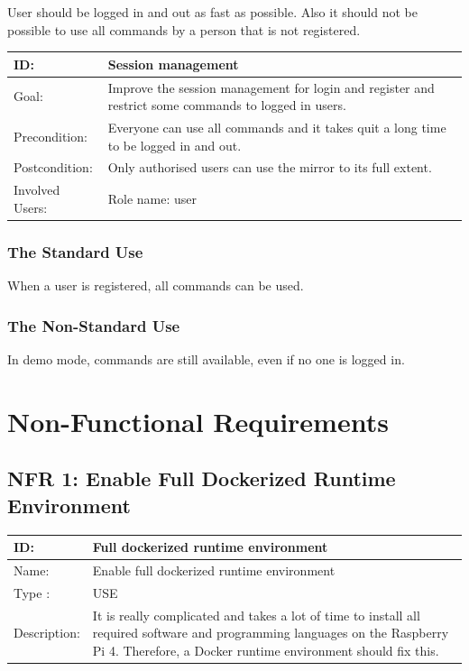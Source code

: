 \documentclass[12pt]{article}
\theoremstyle{definition}
\begin{document}
User should be logged in and out as fast as possible. Also it should not be possible to use all commands  by a person that is not registered. 

\begin{tabular}{|p{.2\linewidth}|p{.65\linewidth}|}
\hline 
ID: & Session management\\ \hline
Goal: & Improve the session management for login and register and restrict some commands to logged in users.\\ \hline
Precondition: & Everyone can use all commands and it takes quit a long time to be logged in and out.\\ \hline
Postcondition: & Only authorised users can use the mirror to its full extent.\\ \hline
Involved Users: & Role name: user \\ \hline
\end{tabular}

\subsubsection{The Standard Use}
When a user is registered, all commands can be used.

\subsubsection{The Non-Standard Use}
In demo mode, commands are still available, even if no one is logged in.


\pagebreak

\section{Non-Functional Requirements}
\subsection{NFR 1: Enable Full Dockerized Runtime Environment}
\begin{tabular}{|p{.2\linewidth}|p{.65\linewidth}|}
\hline 
ID: & Full dockerized runtime environment \\ \hline
Name: & Enable full dockerized runtime environment \\ \hline
Type	: & USE\\ \hline
Description: & It is really complicated and takes a lot of time to install all required software and programming languages on the Raspberry Pi 4. Therefore, a Docker runtime environment should fix this.\\ \hline
\end{tabular}
\end{document}
